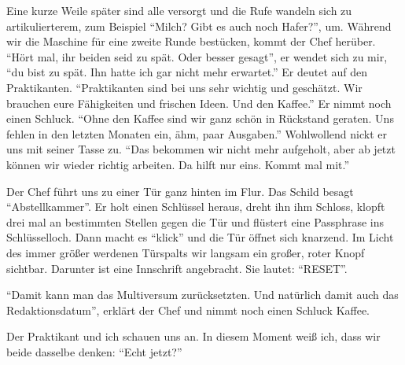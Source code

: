 \documentclass[final]{multiversum}
\begin{document}
Eine kurze Weile später sind alle versorgt und die Rufe wandeln sich zu artikulierterem, zum Beispiel \enquote{Milch? Gibt es auch noch Hafer?}, um.
Während wir die Maschine für eine zweite Runde bestücken, kommt der Chef herüber.
\enquote{Hört mal, ihr beiden seid zu spät. Oder besser gesagt}, er wendet sich zu mir, \enquote{du bist zu spät.
Ihn hatte ich gar nicht mehr erwartet.}
Er deutet auf den Praktikanten.
\enquote{Praktikanten sind bei uns sehr wichtig und geschätzt.
Wir brauchen eure Fähigkeiten und frischen Ideen. 
Und den Kaffee.}
Er nimmt noch einen Schluck.
\enquote{Ohne den Kaffee sind wir ganz schön in Rückstand geraten. 
Uns fehlen in den letzten Monaten ein, ähm, paar Ausgaben.}
Wohlwollend nickt er uns mit seiner Tasse zu.
\enquote{Das bekommen wir nicht mehr aufgeholt, aber ab jetzt können wir wieder richtig arbeiten.
Da hilft nur eins. 
Kommt mal mit.}

Der Chef führt uns zu einer Tür ganz hinten im Flur. 
Das Schild besagt \enquote{Abstellkammer}.
Er holt einen Schlüssel heraus, dreht ihn ihm Schloss, klopft drei mal an bestimmten Stellen gegen die Tür und flüstert eine Passphrase ins Schlüsselloch.
Dann macht es \enquote{klick} und die Tür öffnet sich knarzend.
Im Licht des immer größer werdenen Türspalts wir langsam ein großer, roter Knopf sichtbar.
Darunter ist eine Innschrift angebracht.
Sie lautet: \enquote{RESET}.

\enquote{Damit kann man das Multiversum zurücksetzten.
Und natürlich damit auch das Redaktionsdatum}, erklärt der Chef und nimmt noch einen Schluck Kaffee.

Der Praktikant und ich schauen uns an.
In diesem Moment weiß ich, dass wir beide dasselbe denken:
\enquote{Echt jetzt?}




\end{document}
